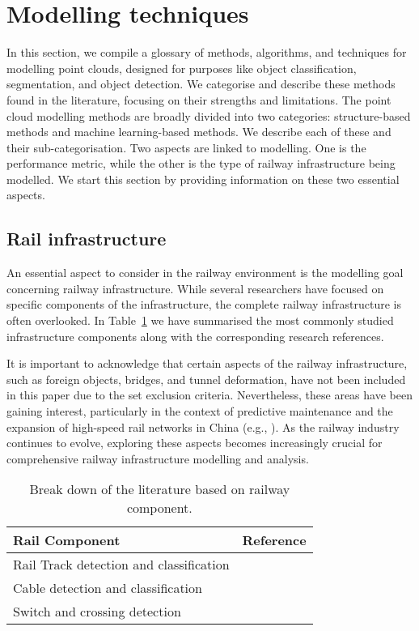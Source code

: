 \section{Modelling techniques} \label{sec:stoa:modelling}
In this section, we compile a glossary of methods, algorithms, and techniques for modelling point clouds, designed for purposes like object classification, segmentation, and object detection. We categorise and describe these methods found in the literature, focusing on their strengths and limitations. The point cloud modelling methods are broadly divided into two categories: structure-based methods and machine learning-based methods. We describe each of these and their sub-categorisation. 
Two aspects are linked to modelling. One is the performance metric, while the other is the type of railway infrastructure being modelled. We start this section by providing information on these two essential aspects. 

\subsection{Rail infrastructure}
An essential aspect to consider in the railway environment is the modelling goal concerning railway infrastructure. While several researchers have focused on specific components of the infrastructure, the complete railway infrastructure is often overlooked.  In Table~\ref{tab:stoa:rail_infra} we have summarised the most commonly studied infrastructure components along with the corresponding research references.
\par It is important to acknowledge that certain aspects of the railway infrastructure, such as foreign objects, bridges, and tunnel deformation, have not been included in this paper due to the set exclusion criteria. Nevertheless, these areas have been gaining interest, particularly in the context of predictive maintenance and the expansion of high-speed rail networks in China (e.g., \cite{chen2021railway}). As the railway industry continues to evolve, exploring these aspects becomes increasingly crucial for comprehensive railway infrastructure modelling and analysis.
\begin{table}[!ht]
    \centering
    \begin{tabular}{ll}\toprule
       \textbf{Rail Component}  & \textbf{Reference}\\\midrule
        Rail Track detection and classification & \cite{arastounia2016application,cui2020real-time}\\
        Cable detection and classification & \cite{arastounia2016application,ariyachandra2020digital,corongiu2020classification,gutirrezfernndez2020automatic}\\
        Switch and crossing detection & \cite{chbeir2015detection,benhmida2011from,hmida2012knowledge-driven,ponciano2015detection}\\\bottomrule
    \end{tabular}
    \caption{Break down of the literature based on railway component.} \label{tab:stoa:rail_infra}   
\end{table}

